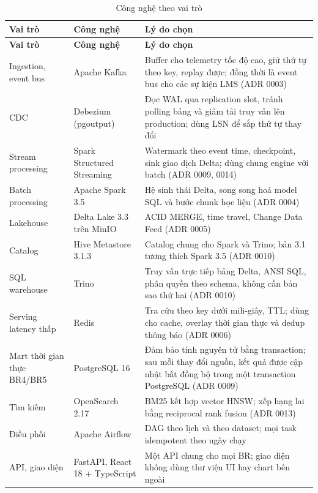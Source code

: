 {\small
\begin{longtable}{@{}L{3.2cm}L{3.4cm}L{7.9cm}@{}}
\caption{Công nghệ theo vai trò}\label{tab:tech}\\
\toprule
\textbf{Vai trò} & \textbf{Công nghệ} & \textbf{Lý do chọn} \\
\midrule
\endfirsthead
\toprule
\textbf{Vai trò} & \textbf{Công nghệ} & \textbf{Lý do chọn} \\
\midrule
\endhead
Ingestion, event bus & Apache Kafka & Buffer cho telemetry tốc độ cao, giữ thứ tự theo key, replay được; đồng thời là event bus cho các sự kiện LMS (ADR 0003) \\
CDC & Debezium (pgoutput) & Đọc WAL qua replication slot, tránh polling bảng và giảm tải truy vấn lên production; dùng LSN để sắp thứ tự thay đổi \\
Stream processing & Spark Structured Streaming & Watermark theo event time, checkpoint, sink giao dịch Delta; dùng chung engine với batch (ADR 0009, 0014) \\
Batch processing & Apache Spark 3.5 & Hệ sinh thái Delta, song song hoá model SQL và bước chunk học liệu (ADR 0004) \\
Lakehouse & Delta Lake 3.3 trên MinIO & ACID MERGE, time travel, Change Data Feed (ADR 0005) \\
Catalog & Hive Metastore 3.1.3 & Catalog chung cho Spark và Trino; bản 3.1 tương thích Spark 3.5 (ADR 0010) \\
SQL warehouse & Trino & Truy vấn trực tiếp bảng Delta, ANSI SQL, phân quyền theo schema, không cần bản sao thứ hai (ADR 0010) \\
Serving latency thấp & Redis & Tra cứu theo key dưới mili-giây, TTL; dùng cho cache, overlay thời gian thực và dedup thông báo (ADR 0006) \\
Mart thời gian thực BR4/BR5 & PostgreSQL 16 & Đảm bảo tính nguyên tử bằng transaction; sau mỗi thay đổi nguồn, kết quả được cập nhật bất đồng bộ trong một transaction PostgreSQL (ADR 0009) \\
Tìm kiếm & OpenSearch 2.17 & BM25 kết hợp vector HNSW; xếp hạng lai bằng reciprocal rank fusion (ADR 0013) \\
Điều phối & Apache Airflow & DAG theo lịch và theo dataset; mọi task idempotent theo ngày chạy \\
API, giao diện & FastAPI, React 18 + TypeScript & Một API chung cho mọi BR; giao diện không dùng thư viện UI hay chart bên ngoài \\
\bottomrule
\end{longtable}}


